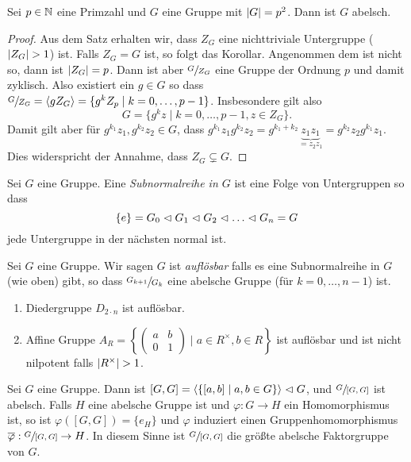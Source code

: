 \begin{corollary}
	Sei $p \in \mathbb{N}$ eine Primzahl und $G$ eine Gruppe mit $\abs{G} = p^2$.
	Dann ist $G$ abelsch.
\end{corollary}

\begin{proof}
	Aus dem Satz erhalten wir, dass $Z_{G}$ eine nichttriviale Untergruppe ($\abs{Z_{G}} > 1$) ist.
	Falls $Z_{G} = G$ ist, so folgt das Korollar.
	Angenommen dem ist nicht so, dann ist $\abs{Z_{G}} = p$.
	Dann ist aber $\sfrac{G}{Z_{G}}$ eine Gruppe der Ordnung $p$ und damit zyklisch.
	Also existiert ein $g \in G$ so dass $\sfrac{G}{Z_{G}} =  \left< g Z_{G} \right> = \{g^{k} Z_{p} \mid k = 0,\ldots,p-1\} $.
	Insbesondere gilt also
	\[
	G = \{g^{k} z \mid k = 0,\ldots,p-1, z \in Z_{G}\} 
	.\]
	Damit gilt aber für $g^{k_1} z_1, g^{k_2} z_2 \in G$, dass $g^{k_1} z_1 g^{k_2}z_2 = g^{k_1 + k_2} \underbrace{z_1 z_1}_{= z_2 z_1} = g^{k_2} z_2 g^{k_1} z_1$.
	Dies widerspricht der Annahme, dass $Z_{G} \subsetneq G$.
\end{proof}

\begin{definition}
	Sei $G$ eine Gruppe. Eine \emph{Subnormalreihe in $G$} ist eine Folge von Untergruppen so dass
	 \[
		 \{e\} = G_0 \vartriangleleft G_1 \vartriangleleft G_2 \vartriangleleft \ldots \vartriangleleft G_{n} = G
	\] 
	jede Untergruppe in der nächsten normal ist.
\end{definition}

\begin{definition}
	Sei $G$ eine Gruppe. Wir sagen $G$ ist \emph{auflösbar} falls es eine Subnormalreihe in $G$ (wie oben) gibt, so dass
	$\sfrac{G_{k+1}}{G_{k}}$ eine abelsche Gruppe (für $k = 0, \ldots, n-1$) ist.
\end{definition}

\begin{eg}
	\begin{enumerate}
		\item Diedergruppe $D_{2\cdot n}$ ist auflösbar.
		\item Affine Gruppe $A_{R} = \left\{\begin{pmatrix} 
					a & b\\ 0 & 1
		\end{pmatrix} \mid a \in R^{\times}, b \in R\right\} $ ist auflösbar und ist nicht nilpotent falls $\abs{R^{\times}} > 1$.
	\end{enumerate}
\end{eg}

\begin{proposition}
	Sei $G$ eine Gruppe. Dann ist $[G,G] = \left< \{ [a,b] \mid a,b \in G \} \right> \vartriangleleft G$, und $\sfrac{G}{[G,G]}$ ist abelsch.
	Falls $H$ eine abelsche Gruppe ist und $\varphi: G \to H$ ein Homomorphismus ist, so ist $\varphi([G,G]) = \{e_{H}\}$
	und $\varphi$ induziert einen Gruppenhomomorphismus $\overline{\varphi}: \sfrac{G}{[G,G]} \to H$.
	In diesem Sinne ist $\sfrac{G}{[G,G]}$ die größte abelsche Faktorgruppe von $G$.
\end{proposition}

